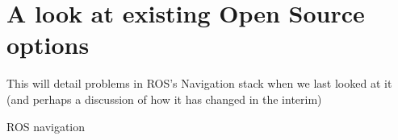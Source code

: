 \section{A look at existing Open Source options}

This will detail problems in ROS's Navigation stack when we last looked at it (and perhaps a discussion of how it has changed in the interim)

ROS navigation \autocite{Marder-Eppstein2010}
